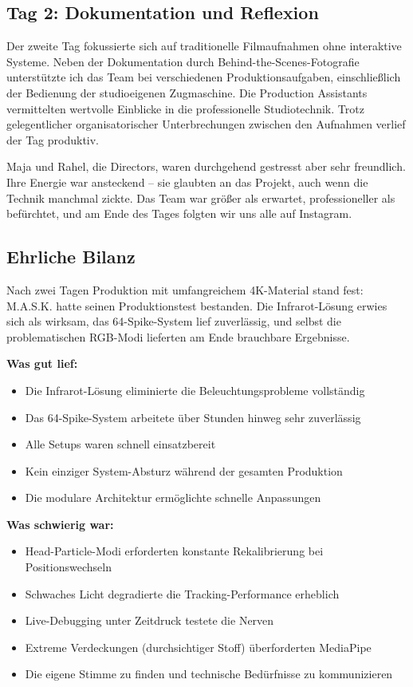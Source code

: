 \subsection{Tag 2: Dokumentation und Reflexion}

Der zweite Tag fokussierte sich auf traditionelle Filmaufnahmen ohne interaktive Systeme. Neben der Dokumentation durch Behind-the-Scenes-Fotografie unterstützte ich das Team bei verschiedenen Produktionsaufgaben, einschließlich der Bedienung der studioeigenen Zugmaschine. Die Production Assistants vermittelten wertvolle Einblicke in die professionelle Studiotechnik. Trotz gelegentlicher organisatorischer Unterbrechungen zwischen den Aufnahmen verlief der Tag produktiv.



Maja und Rahel, die Directors, waren durchgehend gestresst aber sehr freundlich. Ihre Energie war ansteckend – sie glaubten an das Projekt, auch wenn die Technik manchmal zickte. Das Team war größer als erwartet, professioneller als befürchtet, und am Ende des Tages folgten wir uns alle auf Instagram.

\newpage



\clearpage
\subsection{Ehrliche Bilanz}

Nach zwei Tagen Produktion mit umfangreichem 4K-Material stand fest: M.A.S.K. hatte seinen Produktionstest bestanden. Die Infrarot-Lösung erwies sich als wirksam, das 64-Spike-System lief zuverlässig, und selbst die problematischen RGB-Modi lieferten am Ende brauchbare Ergebnisse.

\textbf{Was gut lief:}
\begin{itemize}
   \item Die Infrarot-Lösung eliminierte die Beleuchtungsprobleme vollständig
   \item Das 64-Spike-System arbeitete über Stunden hinweg sehr zuverlässig
   \item Alle Setups waren schnell einsatzbereit
   \item Kein einziger System-Absturz während der gesamten Produktion
   \item Die modulare Architektur ermöglichte schnelle Anpassungen
\end{itemize}

\textbf{Was schwierig war:}
\begin{itemize}
   \item Head-Particle-Modi erforderten konstante Rekalibrierung bei Positionswechseln
   \item Schwaches Licht degradierte die Tracking-Performance erheblich
   \item Live-Debugging unter Zeitdruck testete die Nerven
   \item Extreme Verdeckungen (durchsichtiger Stoff) überforderten MediaPipe
   \item Die eigene Stimme zu finden und technische Bedürfnisse zu kommunizieren
\end{itemize}


